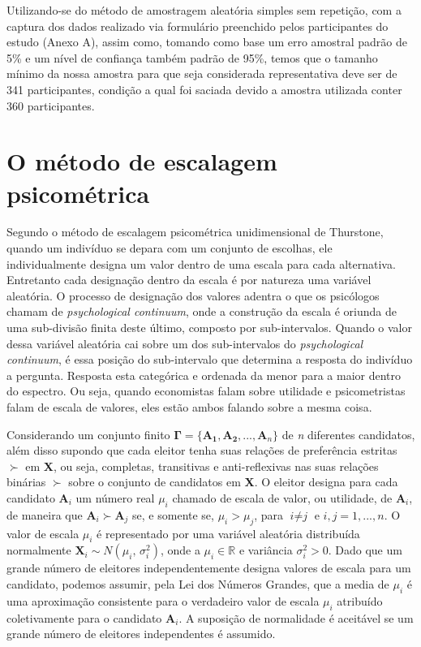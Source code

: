 \documentclass[
	article,			%
	12pt,				%
	oneside,			%
	a4paper,			%
	english,			%
	brazil,				%
	]{abntex2}
\begin{document}
Utilizando-se do método de amostragem aleatória simples sem repetição, com a captura dos dados realizado via formulário preenchido pelos participantes do estudo (Anexo A), assim como, tomando como base um erro amostral padrão de 5\% e um nível de confiança também padrão de 95\%, temos que o tamanho mínimo da nossa amostra para que seja considerada representativa deve ser de 341 participantes, condição a qual foi saciada devido a amostra utilizada conter 360 participantes.


\section{O método de escalagem psicométrica}


Segundo o método de escalagem psicométrica unidimensional de Thurstone, quando um indivíduo se depara com um conjunto de escolhas, ele individualmente designa um valor dentro de uma escala para cada alternativa. Entretanto cada designação dentro da escala é por natureza uma variável aleatória. O processo de designação dos valores adentra o que os psicólogos chamam de \textit{psychological continuum}, onde a construção da escala é oriunda de uma sub-divisão finita deste último, composto por sub-intervalos. Quando o  valor dessa variável aleatória cai sobre um dos sub-intervalos do \textit{psychological continuum}, é essa posição do sub-intervalo que determina a resposta do indivíduo a pergunta. Resposta esta categórica e ordenada da menor para a maior dentro do espectro. Ou seja, quando economistas falam sobre utilidade e psicometristas falam de escala de valores, eles estão ambos falando sobre a mesma coisa.

Considerando um conjunto finito $\mathbf{\Gamma = \{A_1, A_2, ... , A_\textit{n} \}}$ de \textit{n} diferentes candidatos, além disso supondo que cada eleitor tenha suas relações de preferência estritas $\succ$ em \textbf{X}, ou seja, completas, transitivas e anti-reflexivas nas suas relações binárias $\succ$ sobre o conjunto de candidatos em \textbf{X}.
 O eleitor designa para cada candidato $\mathbf{A_\textit{i}}$ um número real $\mu_\textit{i}$ chamado de escala de valor, ou utilidade, de $\mathbf{A_\textit{i}}$, de maneira que $\mathbf{A_\textit{i} \succ A_\textit{j}}$ se, e somente se, $\mu_\textit{i} > \mu_\textit{j}$, para $\textit{i} \neq \textit{j}$ e $\textit{i}, \textit{j} = 1, ... , \textit{n}$.
 O valor de escala $\mu_\textit{i}$ é representado por uma variável aleatória distribuída normalmente $\mathbf{X_\textit{i}}\sim N(\mu_\textit{i}, \,\sigma^2_\textit{i})$, onde a $\mu_\textit{i} \in \mathbb{R}$ e variância  $\sigma^2_\textit{i} > 0$. Dado que um grande número de eleitores independentemente designa valores de escala para um candidato, podemos assumir, pela Lei dos Números Grandes, que a media de $\mu_\textit{i}$ é uma aproximação consistente para o verdadeiro valor de escala $\mu_\textit{i}$ atribuído coletivamente para o candidato $\mathbf{A_\textit{i}}$. A suposição de normalidade é aceitável se um grande número de eleitores independentes é assumido.
\end{document}
